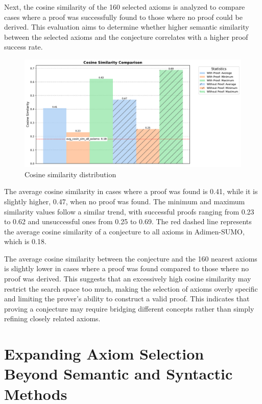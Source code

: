 \documentclass[english,version-2020-11]{uzl-thesis}
\begin{document}
Next, the cosine similarity of the 160 selected axioms is analyzed to compare cases where a proof was successfully found to those where no proof could be derived. This evaluation aims to determine whether higher semantic similarity between the selected axioms and the conjecture correlates with a higher proof success rate.

\begin{figure}[h!]
    \centering
    \includegraphics[width=\textwidth]{cosine_similarity_mini_noAdded_summary.pdf}
    \caption{Cosine similarity distribution}
    \label{fig:cosine_similarity}
\end{figure}
\FloatBarrier

The average cosine similarity in cases where a proof was found is 0.41, while it is slightly higher, 0.47, when no proof was found. The minimum and maximum similarity values follow a similar trend, with successful proofs ranging from 0.23 to 0.62 and unsuccessful ones from 0.25 to 0.69. The red dashed line represents the average cosine similarity of a conjecture to all axioms in Adimen-SUMO, which is 0.18.

The average cosine similarity between the conjecture and the 160 nearest axioms is slightly lower in cases where a proof was found compared to those where no proof was derived. This suggests that an excessively high cosine similarity may restrict the search space too much, making the selection of axioms overly specific and limiting the prover's ability to construct a valid proof. This indicates that proving a conjecture may require bridging different concepts rather than simply refining closely related axioms.


\section{Expanding Axiom Selection Beyond Semantic and Syntactic Methods}
\end{document}
